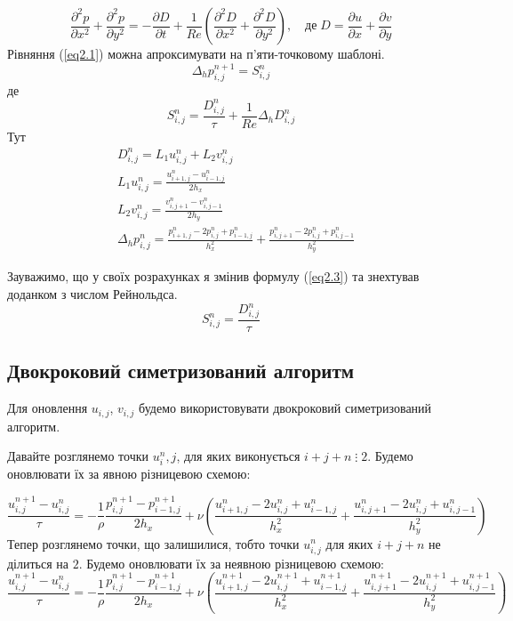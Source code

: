 \documentclass[a4paper,12pt]{article}
\begin{document}
\begin{equation} \label{eq2.1}
	\frac{\partial^2 p}{\partial x^2} + \frac{\partial^2 p}{\partial y^2} = - \frac{\partial D}{\partial t} + \frac{1}{Re} \left( \frac{\partial^2 D}{\partial x^2} + \frac{\partial^2 D}{\partial y^2} \right), \quad \text{де} \; D = \frac{\partial u}{\partial x} + \frac{\partial v}{\partial y}
\end{equation}
Рівняння (\ref{eq2.1}) можна апроксимувати на п'яти-точковому шаблоні.
\begin{equation} \label{eq2.2}
	\Delta_h p^{n+1}_{i,j} = S^{n}_{i,j}
\end{equation}
де
\begin{equation} \label{eq2.3}
	S_{i,j}^{n} = \frac{D_{i,j}^n}{\tau} + \frac{1}{Re} \Delta_h D_{i,j}^n
\end{equation}
Тут
\begin{equation} \label{eq2.4}
	\begin{aligned}
	&D_{i,j}^n = L_1 u_{i,j}^n + L_2 v_{i,j}^n \\
	&L_1 u_{i,j}^n = \frac{u_{i+1,j}^n - u_{i-1,j}^n}{2h_x}\\
	&L_2 v_{i,j}^n = \frac{v_{i,j+1}^n - v_{i,j-1}^n}{2h_y}\\
	&\Delta_h p^n_{i,j} =\frac{p^{n}_{i+1,j} - 2 p^{n}_{i,j} + p^{n}_{i-1,j}}{h_x^2} + \frac{p^{n}_{i,j+1} - 2 p^{n}_{i,j} + p^{n}_{i,j-1}}{h^2_y}
	\end{aligned}
\end{equation}

Зауважимо, що у своїх розрахунках я змінив формулу (\ref{eq2.3}) та знехтував доданком з числом Рейнольдса.
\begin{equation} \label{eq2.5}
	S_{i,j}^{n} = \frac{D_{i,j}^n}{\tau}
\end{equation}

\subsection{Двокроковий симетризований алгоритм}

Для оновлення $u_{i,j}$, $v_{i,j}$ будемо використовувати двокроковий симетризований алгоритм. 

Давайте розглянемо точки $u^n_i,j$, для яких виконується $i+j+n \; \vdots\; 2$. Будемо оновлювати їх за явною різницевою схемою:

\begin{equation} \label{eq2.6}
	\frac{u^{n+1}_{i,j} - u^{n}_{i,j}}{\tau} = - \frac{1}{\rho} \frac{p^{n+1}_{i,j} - p^{n+1}_{i-1,j}}{2h_x}+ \nu \left( \frac{u^{n}_{i+1,j} - 2u^{n}_{i,j} + u^{n}_{i-1,j}}{h_x^2}  + \frac{u^{n}_{i,j+1} -2 u^{n}_{i,j} + u^{n}_{i,j-1}}{h_y^2}\right)
\end{equation}
Тепер розглянемо точки, що залишилися, тобто точки $u_{i,j}^n$ для яких $i+j+n$ не ділиться на $2$. Будемо оновлювати їх за неявною різницевою схемою:
\begin{equation} \label{eq2.7}
	\frac{u^{n+1}_{i,j} - u^{n}_{i,j}}{\tau} = - \frac{1}{\rho} \frac{p^{n+1}_{i,j} - p^{n+1}_{i-1,j}}{2h_x}+ \nu \left( \frac{u^{n+1}_{i+1,j} - 2u^{n+1}_{i,j} + u^{n+1}_{i-1,j}}{h_x^2}  + \frac{u^{n+1}_{i,j+1} -2 u^{n+1}_{i,j} + u^{n+1}_{i,j-1}}{h_y^2}\right)	
\end{equation}
\end{document}
